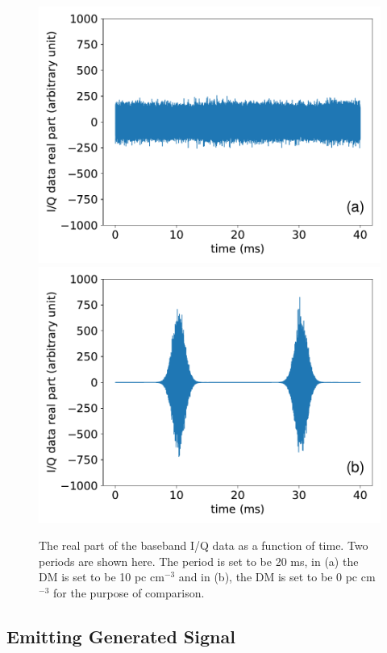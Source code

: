 \documentclass[fleqn,usenatbib]{mnras}
\begin{document}
\begin{figure}
    \centering
    \includegraphics[width=0.95\columnwidth]{dm1_iq.pdf}\\
    \includegraphics[width=0.95\columnwidth]{dm0_iq.pdf}
    \caption{The real part of the baseband I/Q data as a function of time. Two periods are shown here. The period is set to be 20 ms, in (a) the DM is set to be 10 pc cm$^{-3}$ and in (b), the DM is set to be 0 pc cm$^{-3}$ for the purpose of comparison.}
    \label{fig:iq_data}
\end{figure}

\subsection{Emitting Generated Signal}
\end{document}
